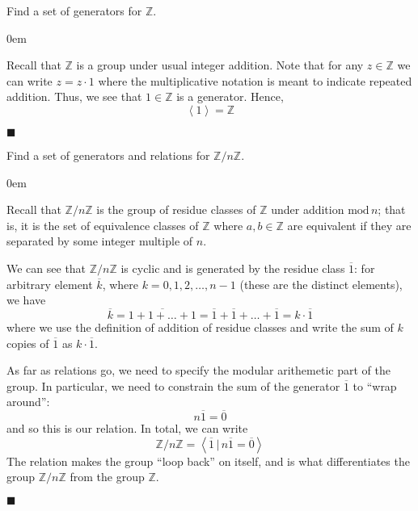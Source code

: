 \documentclass[12pt]{article}
\renewcommand{\qed}{\hfill$\blacksquare$}
\renewenvironment{proof}{\begin{addmargin}[1em]{0em}\begin{newproof}}{\end{newproof}\end{addmargin}\qed}
\newenvironment{problem}[2][Exercise]{\begin{trivlist}
\item[\hskip \labelsep {\bfseries #1}\hskip \labelsep {\bfseries #2.}]}{\end{trivlist}}
\begin{document}
\begin{problem}{1.2.14}
Find a set of generators for $\mathbb{Z}$.
\end{problem}
\begin{proof}
Recall that $\mathbb{Z}$ is a group under usual integer addition. Note that for any $z\in \mathbb{Z}$ we can write $z = z\cdot 1$ where the multiplicative notation is meant to indicate repeated addition. Thus, we see that $1\in \mathbb{Z}$ is a generator. Hence,
$$ \left\langle 1\right\rangle = \mathbb{Z} $$
\end{proof}


\begin{problem}{1.2.15}
Find a set of generators and relations for $\mathbb{Z}/n\mathbb{Z}$.
\end{problem}
\begin{proof}
Recall that $\mathbb{Z}/n\mathbb{Z}$ is the group of residue classes of $\mathbb{Z}$ under addition $\text{mod}\, n$; that is, it is the set of equivalence classes of $\mathbb{Z}$ where $a,b\in\mathbb{Z}$ are equivalent if they are separated by some integer multiple of $n$.

We can see that $\mathbb{Z}/n\mathbb{Z}$ is cyclic and is generated by the residue class $\overline{1}$: for arbitrary element $\overline{k}$, where $k=0,1,2,\ldots,n-1$ (these are the distinct elements), we have $$ \overline{k} = \overline{1+1+\ldots+1} = \overline{1}+\overline{1}+\ldots+\overline{1} = k\cdot \overline{1} $$ where we use the definition of addition of residue classes and write the sum of $k$ copies of $\overline{1}$ as $k\cdot \overline{1}$.

As far as relations go, we need to specify the modular arithemetic part of the group. In particular, we need to constrain the sum of the generator $\overline{1}$ to ``wrap around'':
$$ n\overline{1}=\overline{0} $$ and so this is our relation. In total, we can write
$$ \mathbb{Z}/n\mathbb{Z} = \left\langle \overline{1} \, | \, n\overline{1}=\overline{0} \right\rangle $$ {\color{red} The relation makes the group ``loop back'' on itself, and is what differentiates the group $\mathbb{Z}/n\mathbb{Z}$ from the group $\mathbb{Z}$.}
\end{proof}
\end{document}
